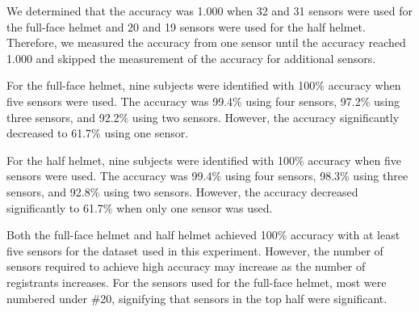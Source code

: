 \documentclass[sigchi,authordraft]{acmart}
\newcommand\figref[1]{\textbf{Figure~\ref{fig:#1}}}
\newcommand\tabref[1]{\textbf{Table~\ref{tab:#1}}}
\begin{document}
We determined that the accuracy was 1.000 when 32 and 31 sensors were used for the full-face helmet and 20 and 19 sensors were used for the half helmet. Therefore, we measured the accuracy from one sensor until the accuracy reached 1.000 and skipped the measurement of the accuracy for additional sensors.\par

For the full-face helmet, nine subjects were identified with 100\% accuracy when five sensors were used. The accuracy was 99.4\% using four sensors, 97.2\% using three sensors, and 92.2\% using two sensors. However, the accuracy significantly decreased to 61.7\% using one sensor.\par

For the half helmet, nine subjects were identified with 100\% accuracy when five sensors were used. The accuracy was 99.4\% using four sensors, 98.3\% using three sensors, and 92.8\% using two sensors. However, the accuracy decreased significantly to 61.7\% when only one sensor was used.\par

Both the full-face helmet and half helmet achieved 100\% accuracy with at least five sensors for the dataset used in this experiment. However, the number of sensors required to achieve high accuracy may increase as the number of registrants increases. For the sensors used for the full-face helmet, most were numbered under \#20, signifying that sensors in the top half were significant.



\end{document}
